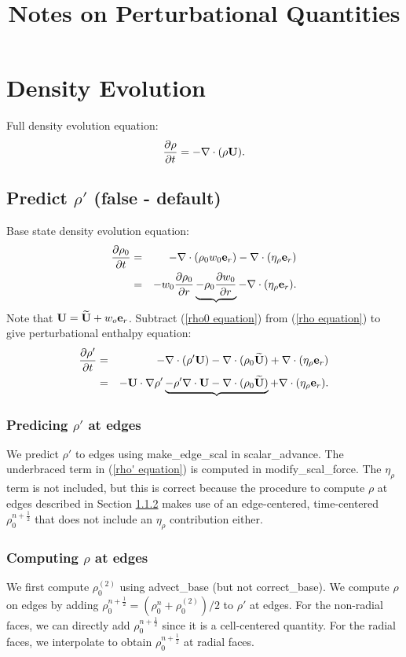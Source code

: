 \documentclass[11pt]{article}
\title{Notes on Perturbational Quantities}
\def\half  {\frac{1}{2}}
\def\eb    {{\bf e}}
\def\Ub    {{\bf U}}
\def\Ubt   {\widetilde{\bf U}}
\begin{document}
\maketitle
\tableofcontents
\cleardoublepage

\section{Density Evolution}
Full density evolution equation:
\begin{equation}
\frac{\partial\rho}{\partial t} = -\nabla\cdot(\rho\Ub). \label{rho equation}
\end{equation}
\subsection{Predict $\rho'$ (false - default)}
Base state density evolution equation:
\begin{eqnarray}
\frac{\partial\rho_0}{\partial t} &=& -\nabla\cdot(\rho_0 w_0 \eb_r) - \nabla\cdot(\eta_\rho \eb_r) \nonumber \\
&=& -w_0\frac{\partial\rho_0}{\partial r} \underbrace{- \rho_0\frac{\partial w_0}{\partial r}} - \nabla\cdot(\eta_\rho \eb_r). \label{rho0 equation}
\end{eqnarray}
Note that $\Ub = \Ubt + w_o\eb_r$.  Subtract (\ref{rho0 equation}) from (\ref{rho equation}) to give perturbational enthalpy equation:
\begin{eqnarray}
\frac{\partial\rho'}{\partial t} &=& -\nabla\cdot(\rho'\Ub) - \nabla\cdot(\rho_0\Ubt) + \nabla\cdot(\eta_\rho \eb_r) \nonumber \\
&=& -\Ub\cdot\nabla\rho' \underbrace{- \rho'\nabla\cdot\Ub - \nabla\cdot(\rho_0\Ubt)} + \nabla\cdot(\eta_\rho \eb_r).\label{rho' equation}
\end{eqnarray}
\subsubsection{Predicing $\rho'$ at edges}
We predict $\rho'$ to edges using make\_edge\_scal in scalar\_advance.  The underbraced term in (\ref{rho' equation}) is computed in modify\_scal\_force.  The $\eta_\rho$ term is not included, but this is correct because the procedure to compute $\rho$ at edges described in Section \ref{Computing rho at edges} makes use of an edge-centered, time-centered $\rho_0^{n+\half}$ that does not include an $\eta_\rho$ contribution either.
\subsubsection{Computing $\rho$ at edges}\label{Computing rho at edges}
We first compute $\rho_0^{(2)}$ using advect\_base (but not correct\_base).  We compute $\rho$ on edges by adding $\rho_0^{n+\half} = (\rho_0^n + \rho_0^{(2)}) / 2$ to $\rho'$ at edges. For the non-radial faces, we can directly add $\rho_0^{n+\half}$ since it is a cell-centered quantity.  For the radial faces, we interpolate to obtain $\rho_0^{n+\half}$ at radial faces.
\end{document}

